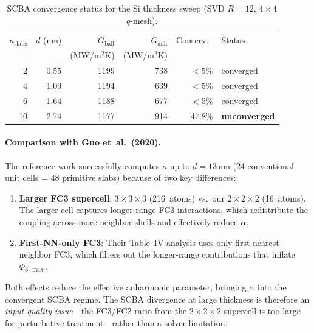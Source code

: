 \begin{table}[h]
  \centering
  \caption{SCBA convergence status for the Si thickness sweep
    (SVD $R = 12$, $4\times 4$ $q$-mesh).}
  \label{tab:thickness_convergence}
  \begin{tabular}{rrrrrl}
    \toprule
    $n_\mathrm{slabs}$ & $d$ (nm) & $G_\mathrm{ball}$ & $G_\mathrm{anh}$
      & Conserv.\ & Status \\
    & & (MW/m$^2$K) & (MW/m$^2$K) & & \\
    \midrule
    2  & 0.55 & 1199 & 738 & $<$5\%    & converged \\
    4  & 1.09 & 1194 & 639 & $<$5\%    & converged \\
    6  & 1.64 & 1188 & 677 & $<$5\%    & converged \\
    10 & 2.74 & 1177 & 914 & 47.8\%    & \textbf{unconverged} \\
    \bottomrule
  \end{tabular}
\end{table}

\paragraph{Comparison with Guo et~al.\ (2020).}
The reference work \cite{guo_quantum_2020} successfully computes
$\kappa$ up to $d = 13$\,nm (24 conventional unit cells = 48 primitive
slabs) because of two key differences:
\begin{enumerate}
  \item \textbf{Larger FC3 supercell}: $3\times 3\times 3$ (216~atoms)
    vs.\ our $2\times 2\times 2$ (16~atoms).  The larger cell captures
    longer-range FC3 interactions, which redistribute the coupling
    across more neighbor shells and effectively reduce $\alpha$.
  \item \textbf{First-NN-only FC3}: Their Table~IV analysis uses only
    first-nearest-neighbor FC3, which filters out the
    longer-range contributions that inflate $\Phi_{3,\max}$.
\end{enumerate}
Both effects reduce the effective anharmonic parameter, bringing
$\alpha$ into the convergent SCBA regime.  The SCBA divergence at
large thickness is therefore an \emph{input quality issue}---the
FC3/FC2 ratio from the $2\times 2\times 2$ supercell is too large for
perturbative treatment---rather than a solver limitation.

